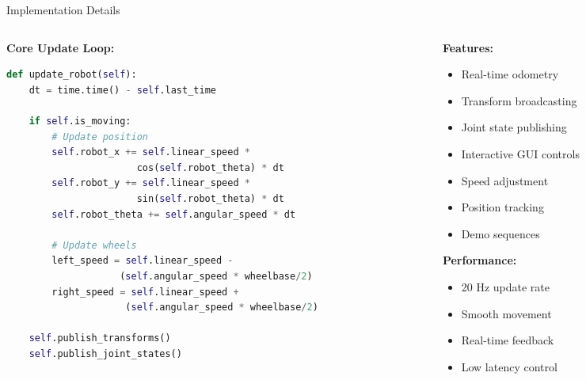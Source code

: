 \documentclass[aspectratio=169]{beamer}
\begin{document}
\begin{frame}{Implementation Details}
\begin{columns}
\begin{column}{0.6\textwidth}
\textbf{Core Update Loop:}
\begin{lstlisting}[language=Python]
def update_robot(self):
    dt = time.time() - self.last_time
    
    if self.is_moving:
        # Update position
        self.robot_x += self.linear_speed * 
                       cos(self.robot_theta) * dt
        self.robot_y += self.linear_speed * 
                       sin(self.robot_theta) * dt
        self.robot_theta += self.angular_speed * dt
        
        # Update wheels
        left_speed = self.linear_speed - 
                    (self.angular_speed * wheelbase/2)
        right_speed = self.linear_speed + 
                     (self.angular_speed * wheelbase/2)
    
    self.publish_transforms()
    self.publish_joint_states()
\end{lstlisting}
\end{column}

\begin{column}{0.4\textwidth}
\textbf{Features:}
\begin{itemize}
    \item Real-time odometry
    \item Transform broadcasting
    \item Joint state publishing
    \item Interactive GUI controls
    \item Speed adjustment
    \item Position tracking
    \item Demo sequences
\end{itemize}

\textbf{Performance:}
\begin{itemize}
    \item 20 Hz update rate
    \item Smooth movement
    \item Real-time feedback
    \item Low latency control
\end{itemize}
\end{column}
\end{columns}
\end{frame}
\end{document}
